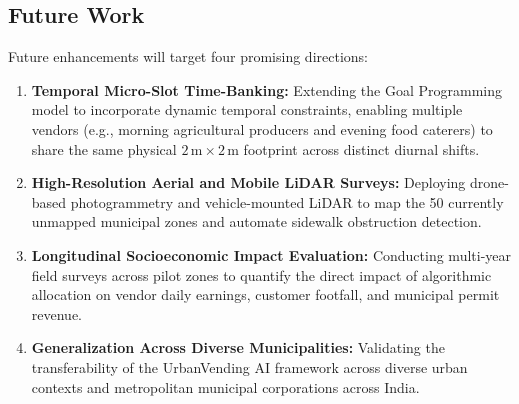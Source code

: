 \subsection{Future Work}
\label{sec:future_work}

Future enhancements will target four promising directions:
\begin{enumerate}
    \item \textbf{Temporal Micro-Slot Time-Banking:} Extending the Goal Programming model to incorporate dynamic temporal constraints, enabling multiple vendors (e.g., morning agricultural producers and evening food caterers) to share the same physical $2\,\text{m}\times 2\,\text{m}$ footprint across distinct diurnal shifts.
    \item \textbf{High-Resolution Aerial and Mobile LiDAR Surveys:} Deploying drone-based photogrammetry and vehicle-mounted LiDAR to map the 50 currently unmapped municipal zones and automate sidewalk obstruction detection.
    \item \textbf{Longitudinal Socioeconomic Impact Evaluation:} Conducting multi-year field surveys across pilot zones to quantify the direct impact of algorithmic allocation on vendor daily earnings, customer footfall, and municipal permit revenue.
    \item \textbf{Generalization Across Diverse Municipalities:} Validating the transferability of the UrbanVending AI framework across diverse urban contexts and metropolitan municipal corporations across India.
\end{enumerate}
